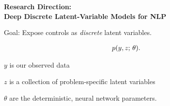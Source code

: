 \documentclass[aspectratio=169]{beamer}
\let\tempone\itemize
\let\temptwo\enditemize
\renewenvironment{itemize}{\tempone\addtolength{\itemsep}{0.5\baselineskip}}{\temptwo}
\begin{document}












\begin{frame}
\begin{center}
    \textbf{Research Direction: \\
      Deep Discrete Latent-Variable Models for NLP }
  \end{center}
  Goal: Expose controls as \textit{discrete} latent variables.


\begin{align*}
p(y, z ; \, \theta).
\end{align*}

\begin{itemize}
    \item $y$ is our observed data
    \item $z$ is a collection of problem-specific latent variables
    \item $\theta$ are the deterministic, neural network parameters.
\end{itemize}



\end{frame}
\end{document}
